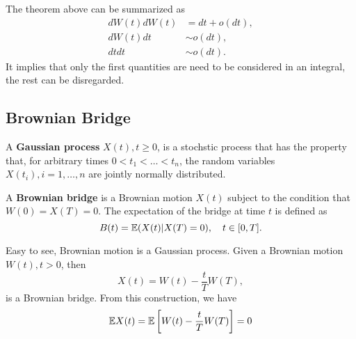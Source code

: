 The theorem above can be summarized as
\begin{equation}
\begin{aligned}
dW(t)dW(t)&=dt+o(dt),\\
dW(t)dt&\sim o(dt),\\
dtdt&\sim o(dt).
\end{aligned}
\end{equation}
It implies that only the first quantities are need to be considered in an integral, the rest can be disregarded.


\subsection{Brownian Bridge}

\begin{definition}
A \textbf{Gaussian process} $X(t),t\ge0$, is a stochstic process that has the property that, for arbitrary times $0<t_1<\dots<t_n$, the random variables $X(t_i),i=1,\dots,n$ are jointly normally distributed. 
\end{definition}


\begin{definition}
A \textbf{Brownian bridge} is a Brownian motion $X(t)$ subject to the condition that $W(0)=X(T)=0$. The expectation of the bridge at time $t$ is defined as
\begin{equation}
B(t)=\mathbb{E}(X(t)|X(T)=0),\quad t\in [0,T].
\end{equation}
\end{definition}

Easy to see, Brownian motion is a Gaussian process. Given a Brownian motion $W(t),t>0$, then
\begin{equation}
X(t)=W(t)-\frac{t}{T}W(T),
\end{equation}
is a Brownian bridge. From this construction, we have
\begin{equation}
\mathbb{E} X(t)=\mathbb{E}\left[W(t)-\frac{t}{T}W(T)\right] = 0
\end{equation}
